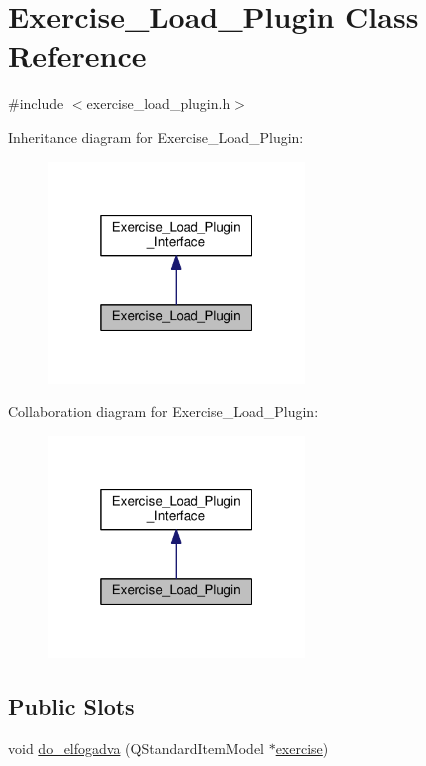 \hypertarget{classExercise__Load__Plugin}{}\section{Exercise\+\_\+\+Load\+\_\+\+Plugin Class Reference}
\label{classExercise__Load__Plugin}


{\ttfamily \#include $<$exercise\+\_\+load\+\_\+plugin.\+h$>$}



Inheritance diagram for Exercise\+\_\+\+Load\+\_\+\+Plugin\+:\nopagebreak
\begin{figure}[H]
\begin{center}
\leavevmode
\includegraphics[width=193pt]{classExercise__Load__Plugin__inherit__graph}
\end{center}
\end{figure}


Collaboration diagram for Exercise\+\_\+\+Load\+\_\+\+Plugin\+:\nopagebreak
\begin{figure}[H]
\begin{center}
\leavevmode
\includegraphics[width=193pt]{classExercise__Load__Plugin__coll__graph}
\end{center}
\end{figure}
\subsection*{Public Slots}
\begin{DoxyCompactItemize}
\item 
void \hyperlink{classExercise__Load__Plugin_af4de0753b05095fed82d7955a0e32cf8}{do\+\_\+elfogadva} (Q\+Standard\+Item\+Model $\ast$\hyperlink{classExercise__Load__Plugin_ab2c84c55120579b1fdb135eb73694837}{exercise})
\end{DoxyCompactItemize}
